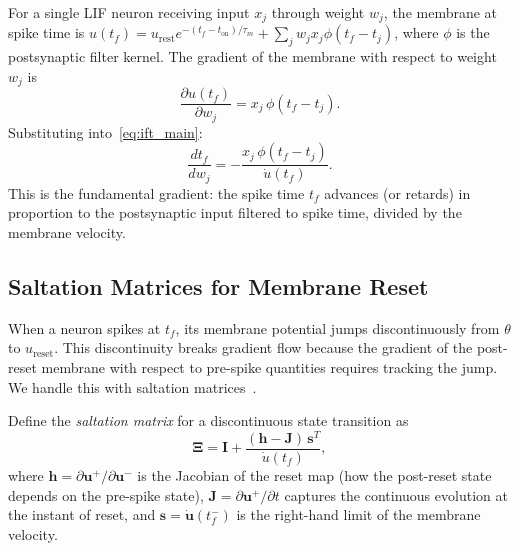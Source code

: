 \documentclass[10pt,twocolumn]{article}
\begin{document}
For a single LIF neuron receiving input $x_j$ through weight $w_j$, the membrane at spike time is $u(t_f) = u_{\text{rest}} e^{-(t_f - t_{\text{on}})/\tau_m} + \sum_j w_j x_j \phi(t_f - t_j)$, where $\phi$ is the postsynaptic filter kernel. The gradient of the membrane with respect to weight $w_j$ is
\begin{equation}
    \frac{\partial u(t_f)}{\partial w_j} = x_j \, \phi(t_f - t_j).
    \label{eq:numerator}
\end{equation}
Substituting into~\eqref{eq:ift_main}:
\begin{equation}
    \frac{dt_f}{dw_j} = -\frac{x_j \, \phi(t_f - t_j)}{\dot{u}(t_f)}.
    \label{eq:single_spike_grad}
\end{equation}
This is the fundamental gradient: the spike time $t_f$ advances (or retards) in proportion to the postsynaptic input filtered to spike time, divided by the membrane velocity.

\subsection{Saltation Matrices for Membrane Reset}

When a neuron spikes at $t_f$, its membrane potential jumps discontinuously from $\theta$ to $u_{\text{reset}}$. This discontinuity breaks gradient flow because the gradient of the post-reset membrane with respect to pre-spike quantities requires tracking the jump. We handle this with saltation matrices~\citep{coombes2014spiking}.

Define the \emph{saltation matrix} for a discontinuous state transition as
\begin{equation}
    \mathbf{\Xi} = \mathbf{I} + \frac{(\mathbf{h} - \mathbf{J}) \, \mathbf{s}^T}{\dot{u}(t_f)},
    \label{eq:saltation}
\end{equation}
where $\mathbf{h} = \partial \mathbf{u}^+ / \partial \mathbf{u}^-$ is the Jacobian of the reset map (how the post-reset state depends on the pre-spike state), $\mathbf{J} = \partial \mathbf{u}^+ / \partial t$ captures the continuous evolution at the instant of reset, and $\mathbf{s} = \dot{\mathbf{u}}(t_f^-)$ is the right-hand limit of the membrane velocity.
\end{document}

